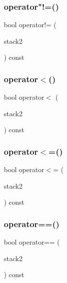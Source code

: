 \mbox{\label{classStack_a21017a086067b8ac1c21c3bdef97a100}} 
\subsubsection{\texorpdfstring{operator"!=()}{operator!=()}}
{\footnotesize\ttfamily bool operator!= (\begin{DoxyParamCaption}\item[{const \mbox{\hyperlink{classStack}{Stack}}$<$ Value\+Type $>$ \&}]{stack2 }\end{DoxyParamCaption}) const}

\mbox{\label{classStack_a6d1900aec1af12a907ad87301d464d2e}} 
\subsubsection{\texorpdfstring{operator$<$()}{operator<()}}
{\footnotesize\ttfamily bool operator$<$ (\begin{DoxyParamCaption}\item[{const \mbox{\hyperlink{classStack}{Stack}}$<$ Value\+Type $>$ \&}]{stack2 }\end{DoxyParamCaption}) const}

\mbox{\label{classStack_a8037a3a4cc044bcfba994893d6f4ab12}} 
\subsubsection{\texorpdfstring{operator$<$=()}{operator<=()}}
{\footnotesize\ttfamily bool operator$<$= (\begin{DoxyParamCaption}\item[{const \mbox{\hyperlink{classStack}{Stack}}$<$ Value\+Type $>$ \&}]{stack2 }\end{DoxyParamCaption}) const}

\mbox{\label{classStack_ade246b6899202c53b8fd8fbe4930b09a}} 
\subsubsection{\texorpdfstring{operator==()}{operator==()}}
{\footnotesize\ttfamily bool operator== (\begin{DoxyParamCaption}\item[{const \mbox{\hyperlink{classStack}{Stack}}$<$ Value\+Type $>$ \&}]{stack2 }\end{DoxyParamCaption}) const}

